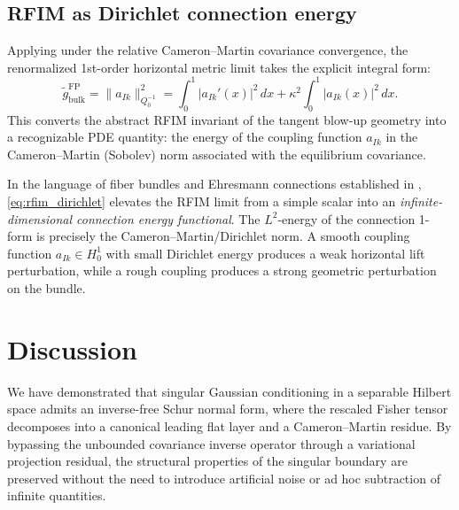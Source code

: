 \documentclass[11pt]{amsart}
\theoremstyle{plain}
\theoremstyle{definition}
\theoremstyle{remark}
\begin{document}
    \subsection{RFIM as Dirichlet connection energy}

    Applying  under the relative Cameron--Martin covariance convergence, the renormalized 1st-order horizontal metric limit takes the explicit integral form:
    \begin{equation}
        \label{eq:rfim_dirichlet}
        \boxed{
        \widetilde{g}_{\mathrm{bulk}}^{\mathrm{FP}}
        = \|a_{Ik}\|_{Q_0^{-1}}^2
        = \int_0^1 |a_{Ik}'(x)|^2\,dx + \kappa^2 \int_0^1 |a_{Ik}(x)|^2\,dx.
        }
    \end{equation}
    This converts the abstract RFIM invariant of the tangent blow-up geometry into a recognizable PDE quantity: the energy of the coupling function $a_{Ik}$ in the Cameron--Martin (Sobolev) norm associated with the equilibrium covariance.

    In the language of fiber bundles and Ehresmann connections established in , \eqref{eq:rfim_dirichlet} elevates the RFIM limit from a simple scalar into an \emph{infinite-dimensional connection energy functional}. The $L^2$-energy of the connection 1-form is precisely the Cameron--Martin/Dirichlet norm. A smooth coupling function $a_{Ik} \in H_0^1$ with small Dirichlet energy produces a weak horizontal lift perturbation, while a rough coupling produces a strong geometric perturbation on the bundle.




    \section{Discussion}
    \label{sec:discussion}

    We have demonstrated that singular Gaussian conditioning in a separable Hilbert space admits an inverse-free Schur normal form, where the rescaled Fisher tensor decomposes into a canonical leading flat layer and a Cameron--Martin residue. By bypassing the unbounded covariance inverse operator through a variational projection residual, the structural properties of the singular boundary are preserved without the need to introduce artificial noise or ad hoc subtraction of infinite quantities.
\end{document}
